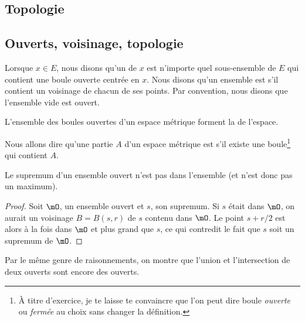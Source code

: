 \subsection{Topologie}

\subsection{Ouverts, voisinage, topologie}

Lorsque $x\in E$, nous disons qu'un  de $x$ est n'importe quel sous-ensemble de $E$ qui contient une boule ouverte centrée en $x$. Nous disons qu'un ensemble est  s'il contient un voisinage de chacun de ses points. Par convention, nous disons que l'ensemble vide est ouvert.

\begin{definition}
L'ensemble des boules ouvertes d'un espace métrique forment la  de l'espace.
\end{definition}

Nous allons dire qu'une partie $A$ d'un espace métrique est  s'il existe une boule\footnote{À titre d'exercice, je te laisse te convaincre que l'on peut dire boule \emph{ouverte} ou \emph{fermée} au choix sans changer la définition.} qui contient $A$.

\begin{lemma}  \label{LemSupOuvPas}
Le supremum d'un ensemble ouvert n'est pas dans l'ensemble (et n'est donc pas un maximum).
\end{lemma}

\begin{proof}
Soit $\mO$, un ensemble ouvert et $s$, son supremum. Si $s$ était dans $\mO$, on aurait un voisinage $B=B(s,r)$ de $s$ contenu dans $\mO$. Le point $s+r/2$ est alors à la fois dans $\mO$ et plus grand que $s$, ce qui contredit le fait que $s$ soit un supremum de $\mO$.
\end{proof}

Par le même genre de raisonnements, on montre que l'union et l'intersection de deux ouverts sont encore des ouverts.

